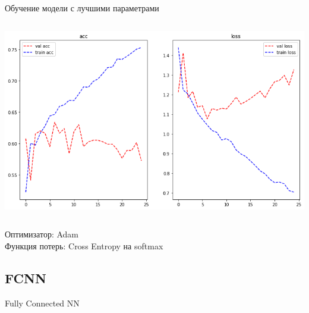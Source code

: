 \documentclass[c, aspectratio = 43]{beamer}
\begin{document}
    \begin{frame}{Обучение модели с лучшими параметрами}
        \begin{columns}
            \includegraphics[width=\linewidth]{rnn_train.png}
        	\begin{table}[]
        	\end{table}
        \end{columns}
        Оптимизатор: Adam\\
        Функция потерь: Cross Entropy на softmax
        \end{frame}


 \subsection{FCNN}

    \begin{frame}{Fully Connected NN}


    \end{frame}
\end{document}
